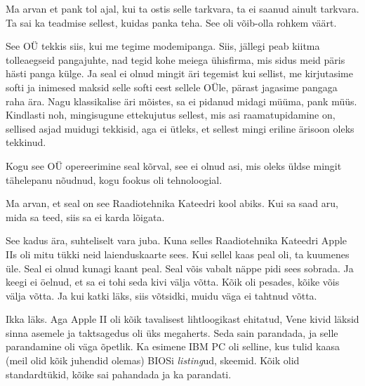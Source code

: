 Ma arvan et pank tol ajal, kui ta ostis selle tarkvara, ta ei saanud ainult 
tarkvara. Ta sai ka teadmise sellest, kuidas panka teha. See oli võib-olla 
rohkem väärt.


See OÜ tekkis siis, kui me tegime modemipanga. Siis, jällegi peab kiitma 
tolleaegseid pangajuhte, nad tegid kohe meiega ühisfirma,  mis sidus meid päris 
hästi panga külge. Ja seal ei olnud mingit äri tegemist kui sellist, me 
kirjutasime softi ja inimesed maksid selle softi eest sellele OÜle, pärast 
jagasime pangaga raha ära. Nagu klassikalise äri mõistes, sa ei pidanud midagi 
müüma, pank müüs. Kindlasti noh, mingisugune ettekujutus sellest, mis asi 
raamatupidamine on,  sellised asjad muidugi tekkisid, aga  ei ütleks, et 
sellest mingi eriline ärisoon oleks tekkinud.

Kogu see OÜ  opereerimine seal kõrval,  see  ei olnud asi, mis oleks üldse 
mingit tähelepanu nõudnud, kogu fookus oli tehnoloogial.


Ma arvan, et seal on see Raadiotehnika Kateedri kool abiks. Kui sa saad aru, 
mida sa teed, siis sa ei karda lõigata.


See kadus ära, suhteliselt vara juba. Kuna selles Raadiotehnika Kateedri Apple 
IIs oli mitu tükki neid laienduskaarte sees. Kui sellel 
kaas peal oli, ta  kuumenes üle. Seal ei olnud kunagi kaant peal. Seal võis 
vabalt näppe pidi sees sobrada. Ja keegi  ei öelnud, et sa ei tohi seda kivi 
välja võtta. Kõik oli pesades, kõike võis välja võtta.  Ja kui katki läks, siis 
võtsidki, muidu väga ei tahtnud võtta. 


Ikka läks. Aga Apple II oli kõik tavalisest 
lihtloogikast ehitatud, Vene kivid läksid sinna asemele ja taktsagedus oli üks 
megaherts. Seda sain parandada, ja selle parandamine oli väga õpetlik. Ka 
esimene IBM PC oli selline, kus tulid kaasa (meil olid 
kõik juhendid olemas)  BIOSi \emph{listing}ud, skeemid. Kõik olid 
standardtükid, kõike sai pahandada ja ka parandati. 

